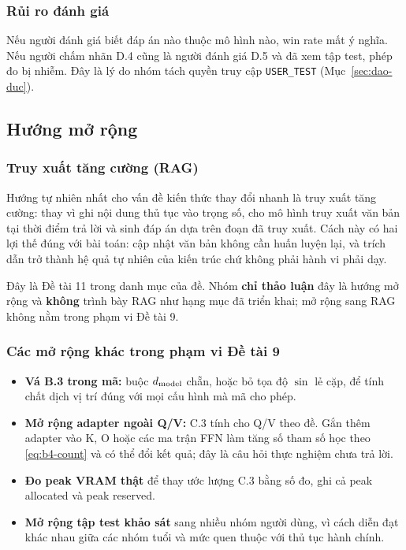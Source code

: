 \subsubsection{Rủi ro đánh giá}

Nếu người đánh giá biết đáp án nào thuộc mô hình nào, win rate mất ý nghĩa. Nếu
người chấm nhãn D.4 cũng là người đánh giá D.5 và đã xem tập test, phép đo bị nhiễm.
Đây là lý do nhóm tách quyền truy cập \texttt{USER\_TEST}
(Mục~\ref{sec:dao-duc}).

\subsection{Hướng mở rộng}

\subsubsection{Truy xuất tăng cường (RAG)}

Hướng tự nhiên nhất cho vấn đề kiến thức thay đổi nhanh là truy xuất tăng cường:
thay vì ghi nội dung thủ tục vào trọng số, cho mô hình truy xuất văn bản tại thời
điểm trả lời và sinh đáp án dựa trên đoạn đã truy xuất. Cách này có hai lợi thế
đúng với bài toán: cập nhật văn bản không cần huấn luyện lại, và trích dẫn trở thành
hệ quả tự nhiên của kiến trúc chứ không phải hành vi phải dạy.

Đây là Đề tài 11 trong danh mục của đề. Nhóm \textbf{chỉ thảo luận} đây là hướng mở
rộng và \textbf{không} trình bày RAG như hạng mục đã triển khai; mở rộng sang RAG
không nằm trong phạm vi Đề tài 9.

\subsubsection{Các mở rộng khác trong phạm vi Đề tài 9}

\begin{itemize}[leftmargin=2em]
\item \textbf{Vá B.3 trong mã:} buộc $d_{\mathrm{model}}$ chẵn, hoặc bỏ tọa độ $\sin$ lẻ cặp,
để tính chất dịch vị trí đúng với mọi cấu hình mà mã cho phép.
\item \textbf{Mở rộng adapter ngoài Q/V:} C.3 tính cho Q/V theo đề. Gắn thêm
adapter vào K, O hoặc các ma trận FFN làm tăng số tham số học theo
\eqref{eq:b4-count} và có thể đổi kết quả; đây là câu hỏi thực nghiệm chưa trả lời.
\item \textbf{Đo peak VRAM thật} để thay ước lượng C.3 bằng số đo, ghi cả peak
allocated và peak reserved.
\item \textbf{Mở rộng tập test khảo sát} sang nhiều nhóm người dùng, vì cách diễn
đạt khác nhau giữa các nhóm tuổi và mức quen thuộc với thủ tục hành chính.
\end{itemize}

